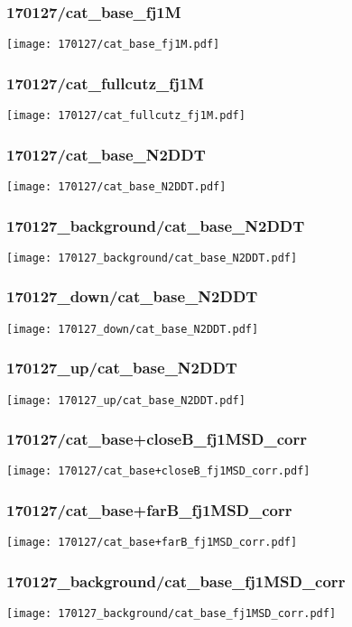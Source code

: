 \begin{frame}
   \frametitle{\small 170127/cat\_base\_fj1M}
   \centering
   \texttt{[image: 170127/cat\_base\_fj1M.pdf]}
\end{frame}

\begin{frame}
   \frametitle{\small 170127/cat\_fullcutz\_fj1M}
   \centering
   \texttt{[image: 170127/cat\_fullcutz\_fj1M.pdf]}
\end{frame}

\begin{frame}
   \frametitle{\small 170127/cat\_base\_N2DDT}
   \centering
   \texttt{[image: 170127/cat\_base\_N2DDT.pdf]}
\end{frame}

\begin{frame}
   \frametitle{\small 170127\_background/cat\_base\_N2DDT}
   \centering
   \texttt{[image: 170127\_background/cat\_base\_N2DDT.pdf]}
\end{frame}

\begin{frame}
   \frametitle{\small 170127\_down/cat\_base\_N2DDT}
   \centering
   \texttt{[image: 170127\_down/cat\_base\_N2DDT.pdf]}
\end{frame}

\begin{frame}
   \frametitle{\small 170127\_up/cat\_base\_N2DDT}
   \centering
   \texttt{[image: 170127\_up/cat\_base\_N2DDT.pdf]}
\end{frame}

\begin{frame}
   \frametitle{\small 170127/cat\_base+closeB\_fj1MSD\_corr}
   \centering
   \texttt{[image: 170127/cat\_base+closeB\_fj1MSD\_corr.pdf]}
\end{frame}

\begin{frame}
   \frametitle{\small 170127/cat\_base+farB\_fj1MSD\_corr}
   \centering
   \texttt{[image: 170127/cat\_base+farB\_fj1MSD\_corr.pdf]}
\end{frame}

\begin{frame}
   \frametitle{\small 170127\_background/cat\_base\_fj1MSD\_corr}
   \centering
   \texttt{[image: 170127\_background/cat\_base\_fj1MSD\_corr.pdf]}
\end{frame}

